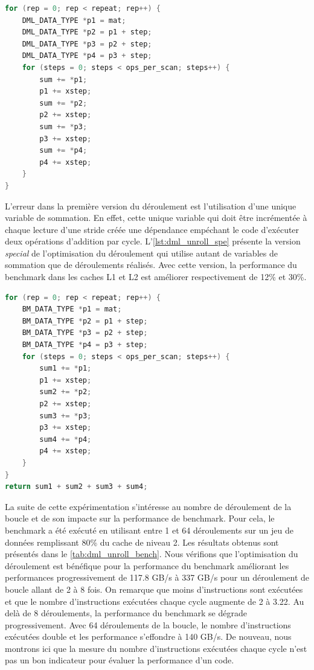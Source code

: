     \begin{lstlisting}[label=lst:dml_unroll_orig ,language=C, caption=Première version du déroulement de la boucle par 4.]
for (rep = 0; rep < repeat; rep++) {
    DML_DATA_TYPE *p1 = mat;
    DML_DATA_TYPE *p2 = p1 + step;
    DML_DATA_TYPE *p3 = p2 + step;
    DML_DATA_TYPE *p4 = p3 + step;
    for (steps = 0; steps < ops_per_scan; steps++) {
        sum += *p1;
        p1 += xstep;
        sum += *p2;
        p2 += xstep;
        sum += *p3;
        p3 += xstep;
        sum += *p4;
        p4 += xstep;
    }
}
\end{lstlisting}


    L'erreur dans la première version du déroulement est l'utilisation d'une unique variable de sommation. En effet, cette unique variable qui doit être incrémentée à chaque lecture d'une stride créée une dépendance empéchant le code d'exécuter deux opérations d'addition par cycle. L'\autoref{lst:dml_unroll_spe} présente la version \textit{special} de l'optimisation du déroulement qui utilise autant de variables de sommation que de déroulements réalisés. Avec cette version, la performance du benchmark dans les caches L1 et L2 est améliorer respectivement de 12\% et 30\%. 
    
    \begin{lstlisting}[label=lst:dml_unroll_spe ,language=C, caption=Deuxième version du déroulement par 4 utilisant 4 variables sum.]
for (rep = 0; rep < repeat; rep++) {
    BM_DATA_TYPE *p1 = mat;
    BM_DATA_TYPE *p2 = p1 + step;
    BM_DATA_TYPE *p3 = p2 + step;
    BM_DATA_TYPE *p4 = p3 + step;
    for (steps = 0; steps < ops_per_scan; steps++) {
        sum1 += *p1;
        p1 += xstep;
        sum2 += *p2;
        p2 += xstep;
        sum3 += *p3;
        p3 += xstep;
        sum4 += *p4;
        p4 += xstep;
    }
}
return sum1 + sum2 + sum3 + sum4;
\end{lstlisting}
    
    La suite de cette expérimentation s'intéresse au nombre de déroulement de la boucle et de son impacte sur la performance de benchmark. Pour cela, le benchmark a été exécuté en utilisant entre 1 et 64 déroulements sur un jeu de données remplissant 80\% du cache de niveau 2. Les résultats obtenus sont présentés dans le \autoref{tab:dml_unroll_bench}. Nous vérifions que l'optimisation du déroulement est bénéfique pour la performance du benchmark améliorant les performances progressivement de 117.8 GB/s à 337 GB/s pour un déroulement de boucle allant de 2 à 8 fois. On remarque que moins d'instructions sont exécutées et que le nombre d'instructions exécutées chaque cycle augmente de 2 à 3.22. Au delà de 8 déroulements, la performance du benchmark se dégrade progressivement. Avec 64 déroulements de la boucle, le nombre d'instructions exécutées double et les performance s'effondre à 140 GB/s. De nouveau, nous montrons ici que la mesure du nombre d'instructions exécutées chaque cycle n'est pas un bon indicateur pour évaluer la performance d'un code. 
    

